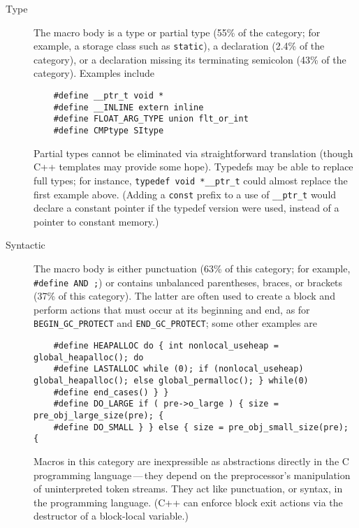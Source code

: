 \documentclass[10pt]{article}
\begin{document}
\begin{description}
\item[Type] 
  The macro body is a type or partial type (55\% of the category; for
  example, a storage class such as {\tt static}), a declaration
  (2.4\% of the category), or a declaration missing its terminating
  semicolon (43\% of the category).  Examples include
\begin{verbatim}
    #define __ptr_t void *
    #define __INLINE extern inline
    #define FLOAT_ARG_TYPE union flt_or_int
    #define CMPtype SItype
\end{verbatim}
  Partial types cannot be eliminated via straightforward translation
  (though C++ templates may provide some hope).  Typedefs may be able to
  replace full types; for instance, {\tt typedef void \verb|*__ptr_t|} could
  almost replace the first example above. (Adding a \verb|const| prefix
  to a use of \verb|__ptr_t| would declare a constant pointer if the typedef
  version were used, instead of a pointer to constant memory.)


\item[Syntactic]  The macro body is either punctuation (63\% of this
  category; for example, {\tt \#define AND ;}) or contains unbalanced
  parentheses, braces, or brackets (37\% of this category).  The latter are
  often used to create a block and perform actions that must occur at its
  beginning and end, as for \verb|BEGIN_GC_PROTECT| and
  \verb|END_GC_PROTECT|; some other examples are 
\begin{verbatim}
    #define HEAPALLOC do { int nonlocal_useheap = global_heapalloc(); do
    #define LASTALLOC while (0); if (nonlocal_useheap) global_heapalloc(); else global_permalloc(); } while(0)
    #define end_cases() } }
    #define DO_LARGE if ( pre->o_large ) { size = pre_obj_large_size(pre); {
    #define DO_SMALL } } else { size = pre_obj_small_size(pre); {
\end{verbatim}
  Macros in this category are inexpressible as
  abstractions directly in the C programming language\,---\,they depend on the
  preprocessor's manipulation of uninterpreted token streams.  They act
  like punctuation, or syntax, in the programming language.  (C++ can
  enforce block exit actions via the destructor of a block-local variable.)



\end{description}
\end{document}
